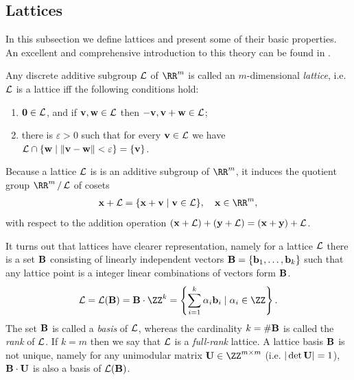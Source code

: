 \documentclass{fundam}
\begin{document}
\subsection{Lattices}\label{Lattices}
In this subsection we define lattices and present some of their basic properties. An excellent and comprehensive introduction to this theory can be found in \cite{peikert2015decade}.   

\vspace{0.5cm}
Any discrete additive subgroup $\mathcal{L}$ of $\RR^{m}$ is called an $m$-dimensional \textit{lattice}, i.e. $\mathcal{L}$ is a lattice iff the following conditions hold:
\begin{enumerate}
	\item $\mathbf{0}\in \mathcal{L}$, and if $\mathbf{v}, \mathbf{w}\in\mathcal{L}$ then $-\mathbf{v}, \mathbf{v}+\mathbf{w}\in \mathcal{L}$; 
	\item there is $\varepsilon >0$ such that for every $\mathbf{v}\in \mathcal{L}$ we have $\mathcal{L}\cap \{ \mathbf{w}\mid \| \mathbf{v}-\mathbf{w}\|<\varepsilon \} = \{\mathbf{v}\}$.
\end{enumerate}

Because a lattice $\mathcal{L}$ is is an additive subgroup of $\RR^{m}$, it induces the quotient group $\quotient{\RR^{m}}{\Lat}$ of cosets
\begin{align*}
	\vr{x} + \Lat = \{ \vr{x}+\vr{v} \mid \vr{v}\in\Lat  \}, ~~~\vr{x}\in\RR^{m},
\end{align*}
with respect to the addition operation $(\mathbf{x}+\mathcal{L}) + (\mathbf{y}+\mathcal{L}) = (\mathbf{x}+\mathbf{y}) + \mathcal{L}$.

It turns out that lattices have clearer representation, namely for a lattice $\mathcal{L}$ there is a set $\mathbf{B}$  consisting of linearly independent vectors $\mathbf{B} = \{\mathbf{b}_{1}, \ldots , \mathbf{b}_{k}\}$ such that any lattice point is a integer linear combinations of vectors form $\mathbf{B}$. 
\begin{align*}
	\Lat = \Lat (\vr{B})=\vr{B}\cdot \ZZ^{k} = \left\{  \sum_{i=1}^{k}\alpha_{i}\vr{b}_{i}\mid \alpha_{i}\in\ZZ  \right\}.
\end{align*}
The set $\mathbf{B}$ is called a \textit{basis} of $\mathcal{L}$, whereas the cardinality $k=\#\mathbf{B}$ is called the \textit{rank} of $\mathcal{L}$.   
If $k=m$ then we say that $\mathcal{L}$ is a \textit{full-rank} lattice.  A lattice basis $\mathbf{B}$ is not unique, namely for any unimodular matrix $\vr{U}\in \ZZ^{m\times m}$ (i.e. $|\det{\mathbf{U}}|=1$), $\mathbf{B}\cdot \mathbf{U}$ is also a basis of $\mathcal{L}(\mathbf{B})$. 
\end{document}
